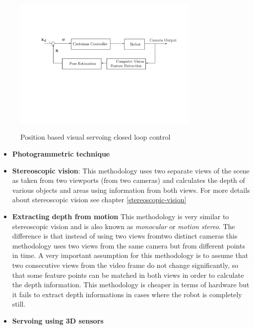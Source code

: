 \begin{center}
\begin{figure}[!htb]
\centering
\includegraphics[width=0.8\textwidth]{images/visual-servoing-position-based.png}\\
\caption{Position based visual servoing closed loop control}
\end{figure}
\end{center}

\begin{itemize}
\item \textbf{Photogrammetric technique}
\item \textbf{Stereoscopic vision}: This methodology uses two separate views of the scene as taken from two viewports (from two cameras) 
and calculates the depth of various objects and areas using information from both views. For more details about stereoscopic vision see chapter \ref{stereoscopic-vision}
\item \textbf{Extracting depth from motion} This methodology is very similar to stereoscopic vision and is also known as \textit{monocular} or \textit{motion stereo}. The difference is that instead of using two views fromtwo distinct cameras this methodology 
uses two views from the same camera but from different points in time. A very important assumption for this methodology is to assume that two consecutive views from the video frame do not change significantly, so that some feature points can be matched in both views in order to calculate the depth information. This methodology 
is cheaper in terms of hardware but it fails to extract depth informations in cases where the robot is completely still.
\item \textbf{Servoing using 3D sensors}
\end{itemize}

